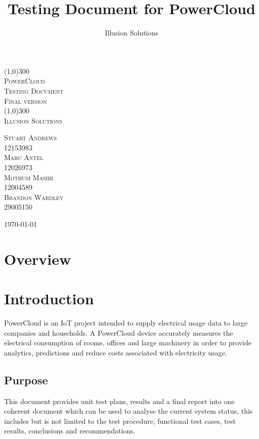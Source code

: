 \documentclass[a4paper,10pt]{article}
\title{Testing Document for PowerCloud}
\author{Illusion Solutions}
\begin{document}
	
	\begin{titlepage}
		\begin{center}
			\line(1,0){300} \\
			[0.1cm]
			\textsc{\Huge
				PowerCloud\\
				Testing Document
			} \\
			\textsc{\large Final version}\\
			[0.1cm]
			\line(1,0){300} \\
			[2.0cm]
			\textsc{\Large
				Illusion Solutions
			} \\
			[3.5cm]
			
		\end{center}
		\begin{flushright}
			\textsc{\Large
				Stuart Andrews\\ 
				12153983\\
				Marc Antel\\
				12026973\\
				Mothusi Masibi\\
				12004589\\
				Brandon Wardley\\
				29005150\\
				[4.0cm]
			}
		\end{flushright}
		\begin{center}
			\today
		\end{center}
	\end{titlepage}
	
	\newpage
	\restoregeometry
	\tableofcontents
	\thispagestyle{empty}
	\newpage
	
	\section{Overview}

	\section{Introduction}
	PowerCloud is an IoT project intended to supply electrical usage data to large companies and 
	households. A PowerCloud device accurately measures the electrical consumption of rooms, offices and 
	large machinery in order to provide analytics, predictions and reduce costs associated with electricity 
	usage.
	
		\subsection{Purpose}
		This document provides unit test plans, results and a final report into one coherent document which can be used to analyse the current system status, this includes but is not limited to the test procedure, functional test cases, test results, conclusions and recommendations.
		
\end{document}
